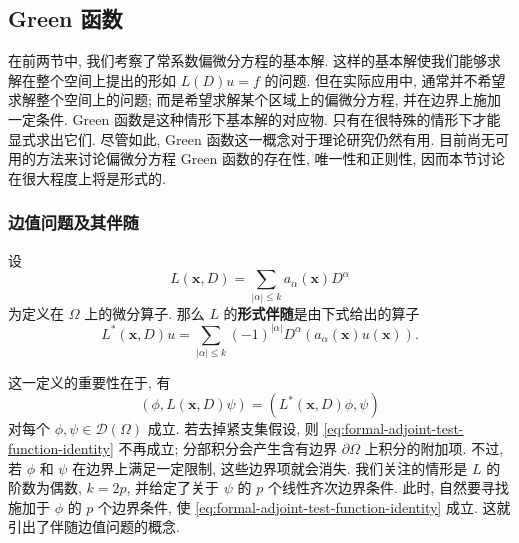 \subsection{Green 函数}\label{sec:greens-functions}

在前两节中, 我们考察了常系数偏微分方程的基本解. 这样的基本解使我们能够求解在整个空间上提出的形如 $L(D)u=f$ 的问题. 但在实际应用中, 通常并不希望求解整个空间上的问题; 而是希望求解某个区域上的偏微分方程, 并在边界上施加一定条件. Green 函数是这种情形下基本解的对应物. 只有在很特殊的情形下才能显式求出它们. 尽管如此, Green 函数这一概念对于理论研究仍然有用. 目前尚无可用的方法来讨论偏微分方程 Green 函数的存在性, 唯一性和正则性, 因而本节讨论在很大程度上将是形式的.

\subsubsection{边值问题及其伴随}\label{subsec:boundary-value-problems-adjoints}

\begin{Definition}
\label{def:formal-adjoint-differential-operator}
设
\begin{equation}\label{eq:variable-coefficient-differential-operator}
L(\bm{x},D)=\sum_{|\alpha|\leq k}a_\alpha(\bm{x})D^\alpha
\end{equation}
为定义在 $\Omega$ 上的微分算子. 那么 $L$ 的\textbf{形式伴随}是由下式给出的算子
\begin{equation}\label{eq:formal-adjoint-differential-operator}
L^*(\bm{x},D)u=\sum_{|\alpha|\leq k}(-1)^{|\alpha|}D^\alpha(a_\alpha(\bm{x})u(\bm{x})).
\end{equation}

\end{Definition}

这一定义的重要性在于, 有
\begin{equation}\label{eq:formal-adjoint-test-function-identity}
(\phi,L(\bm{x},D)\psi)=(L^*(\bm{x},D)\phi,\psi)
\end{equation}
对每个 $\phi,\psi\in\mathcal{D}(\Omega)$ 成立. 若去掉紧支集假设, 则 \eqref{eq:formal-adjoint-test-function-identity} 不再成立; 分部积分会产生含有边界 $\partial\Omega$ 上积分的附加项. 不过, 若 $\phi$ 和 $\psi$ 在边界上满足一定限制, 这些边界项就会消失. 我们关注的情形是 $L$ 的阶数为偶数, $k=2p$, 并给定了关于 $\psi$ 的 $p$ 个线性齐次边界条件. 此时, 自然要寻找施加于 $\phi$ 的 $p$ 个边界条件, 使 \eqref{eq:formal-adjoint-test-function-identity} 成立. 这就引出了伴随边值问题的概念.


